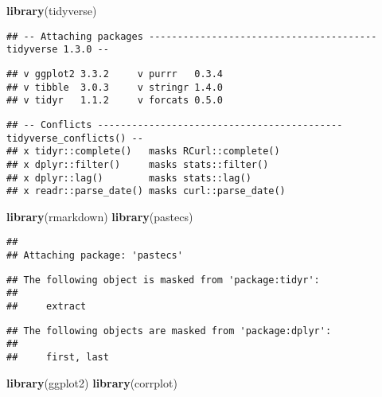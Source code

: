 \documentclass[
]{article}
\newenvironment{Shaded}{\begin{snugshade}}{\end{snugshade}}
\newcommand{\KeywordTok}[1]{\textcolor[rgb]{0.13,0.29,0.53}{\textbf{#1}}}
\newcommand{\NormalTok}[1]{#1}
\begin{document}
\begin{Shaded}
\begin{Highlighting}[]
\KeywordTok{library}\NormalTok{(tidyverse)}
\end{Highlighting}
\end{Shaded}

\begin{verbatim}
## -- Attaching packages ---------------------------------------- tidyverse 1.3.0 --
\end{verbatim}

\begin{verbatim}
## v ggplot2 3.3.2     v purrr   0.3.4
## v tibble  3.0.3     v stringr 1.4.0
## v tidyr   1.1.2     v forcats 0.5.0
\end{verbatim}

\begin{verbatim}
## -- Conflicts ------------------------------------------- tidyverse_conflicts() --
## x tidyr::complete()   masks RCurl::complete()
## x dplyr::filter()     masks stats::filter()
## x dplyr::lag()        masks stats::lag()
## x readr::parse_date() masks curl::parse_date()
\end{verbatim}

\begin{Shaded}
\begin{Highlighting}[]
\KeywordTok{library}\NormalTok{(rmarkdown)}
\KeywordTok{library}\NormalTok{(pastecs)}
\end{Highlighting}
\end{Shaded}

\begin{verbatim}
## 
## Attaching package: 'pastecs'
\end{verbatim}

\begin{verbatim}
## The following object is masked from 'package:tidyr':
## 
##     extract
\end{verbatim}

\begin{verbatim}
## The following objects are masked from 'package:dplyr':
## 
##     first, last
\end{verbatim}

\begin{Shaded}
\begin{Highlighting}[]
\KeywordTok{library}\NormalTok{(ggplot2)}
\KeywordTok{library}\NormalTok{(corrplot)}
\end{Highlighting}
\end{Shaded}
\end{document}
